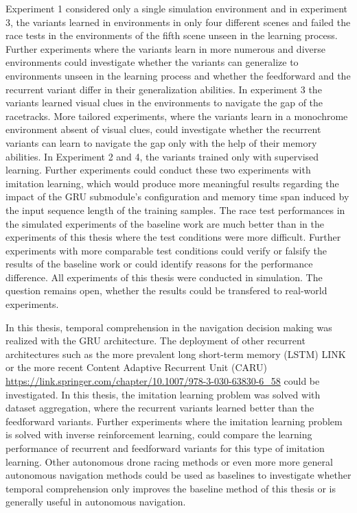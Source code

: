 Experiment 1 considered only a single simulation environment
and in experiment 3, the variants learned in environments in only four different scenes
and failed the race tests in the environments of the fifth scene unseen in the learning process.
Further experiments where the variants learn in more numerous and diverse environments
could investigate whether the variants can generalize to environments unseen in the learning process
and whether the feedforward and the recurrent variant differ in their generalization abilities.
In experiment 3 the variants learned visual clues in the environments to navigate the gap of the racetracks.
More tailored experiments, where the variants learn in a monochrome environment absent of visual clues,
could investigate whether the recurrent variants can learn to navigate the gap only with the help of their memory abilities.
In Experiment 2 and 4, the variants trained only with supervised learning.
Further experiments could conduct these two experiments with imitation learning,
which would produce more meaningful results regarding the impact of the
GRU submodule's configuration and memory time span
induced by the input sequence length of the training samples.
The race test performances in the simulated experiments of the baseline work are much better than
in the experiments of this thesis where the test conditions were more difficult.
Further experiments with more comparable test conditions
could verify or falsify the results of the baseline work 
or could identify reasons for the performance difference.
All experiments of this thesis were conducted in simulation.
The question remains open, whether the results could be transfered to real-world experiments.

In this thesis, temporal comprehension in the navigation decision making
was realized with the GRU architecture.
The deployment of other recurrent architectures such as the
more prevalent long short-term memory (LSTM) LINK or the more recent
Content Adaptive Recurrent Unit (CARU)
\url{https://link.springer.com/chapter/10.1007/978-3-030-63830-6_58}
could be investigated.
In this thesis, the imitation learning problem was solved with dataset aggregation,
where the recurrent variants learned better than the feedforward variants.
Further experiments where the imitation learning problem is solved with inverse reinforcement learning,
could compare the learning performance of recurrent and feedforward variants for this type of imitation learning.
Other autonomous drone racing methods or even more more general autonomous navigation methods
could be used as baselines to investigate whether temporal comprehension only improves the baseline method 
of this thesis or is generally useful in autonomous navigation.





